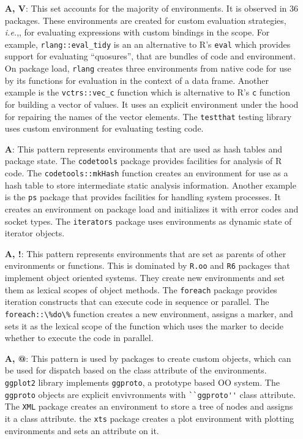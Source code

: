 \documentclass[10pt,review,sigplan,anonymous=true,authorversion=true,nonacm=true]{acmart}
\newcommand{\code}[1]{\lstinline |#1|\xspace}
\newcommand{\ie}{\emph{i.e.},\xspace}
\begin{document}
\begin{itemize}
\item[\textbf{A, V}:] This set accounts for the majority of environments. It is
  observed in 36 packages. These environments are created for custom evaluation
  strategies, \ie, for evaluating expressions with custom bindings in the scope.
  For example, \code{rlang::eval_tidy} is an an alternative to R's \code{eval}
  which provides support for evaluating ``quosures'', that are bundles of code
  and environment. On package load, \code{rlang} creates three environments from
  native code for use by its functions for evaluation in the context of a data
  frame. Another example is the \code{vctrs::vec_c} function which is
  alternative to R's \code{c} function for building a vector of values. It uses
  an explicit environment under the hood for repairing the names of the vector
  elements. The \code{testthat} testing library uses custom environment for
  evaluating testing code.

\item[\textbf{A}:] This pattern represents environments that are used as hash
  tables and package state. The \code{codetools} package provides facilities for
  analysis of R code. The \code{codetools::mkHash} function creates an
  environment for use as a hash table to store intermediate static analysis
  information. Another example is the \code{ps} package that provides facilities
  for handling system processes. It creates an environment on package load and
  initializes it with error codes and socket types. The \code{iterators} package
  uses environments as dynamic state of iterator objects.

\item[\textbf{A, !}:] This pattern represents environments that are set as
  parents of other environments or functions. This is dominated by \code{R.oo}
  and \code{R6} packages that implement object oriented systems. They create new
  environments and set them as lexical scopes of object methods. The
  \code{foreach} package provides iteration constructs that can execute code in
  sequence or parallel. The \code{foreach::\%do\%} function creates a new
  environment, assigns a marker, and sets it as the lexical scope of the
  function which uses the marker to decide whether to execute the code in
  parallel.

\item[\textbf{A, @}:] This pattern is used by packages to create custom objects,
  which can be used for dispatch based on the class attribute of the
  environments. \code{ggplot2} library implements \code{ggproto}, a prototype
  based OO system. The \code{ggproto} objects are explicit envivronments with
  \code{``ggproto''} class attribute. The \code{XML} package creates an environment
  to store a tree of nodes and assigns it a class attribute. the \code{xts}
  package creates a plot environment with plotting environments and sets an
  attribute on it.


\end{itemize}
\end{document}
